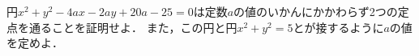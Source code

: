 \documentclass[../../main.tex]{subfiles}
\begin{document}
円$x^2+y^2-4ax-2ay+20a-25=0$は定数$a$の値のいかんにかかわらず2つの定点を通ることを証明せよ．
また，この円と円$x^2+y^2=5$とが接するように$a$の値を定めよ．
\end{document}
